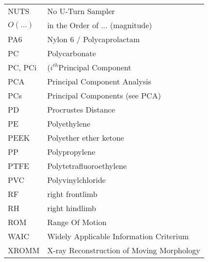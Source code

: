 \begin{small}
\begin{longtable}{l @{ -- } l}
\\ NUTS & No U-Turn Sampler
\\ \(O\left(\ldots\right)\) & in the Order of ... (magnitude)
\\ PA6 & Nylon 6 / Polycaprolactam
\\ PC & Polycarbonate
\\ PC, PCi & (\(i^{th}\)Principal Component
\\ PCA & Principal Component Analysis
\\ PCs & Principal Components (see PCA)
\\ PD & Procrustes Distance
\\ PE & Polyethylene
\\ PEEK & Polyether ether ketone
\\ PP & Polypropylene
\\ PTFE & Polytetrafluoroethylene
\\ PVC & Polyvinylchloride
\\ RF & right frontlimb
\\ RH & right hindlimb
\\ ROM & Range Of Motion
\\ WAIC & Widely Applicable Information Criterium
\\ XROMM & X-ray Reconstruction of Moving Morphology
\end{longtable}
\end{small}
